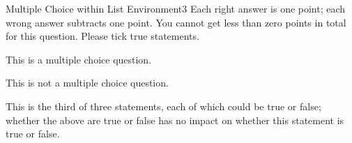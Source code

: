 \begin{question-}{Multiple Choice within List Environment}{3}
Each right answer is one point; each wrong answer subtracts one point. You cannot get less than zero points in total for this question. Please tick true statements. 
\begin{itemize}
\itemtrue This is a multiple choice question.

\itemfalse This is not a multiple choice question.

\itemtrue This is the third of three statements, each of which could be true or false; whether the above are true or false has no impact on whether this statement is true or false.
\end{itemize}

\end{question-}